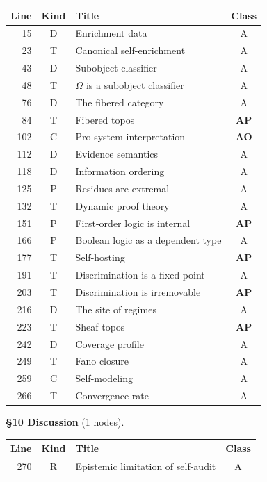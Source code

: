 \begin{center}
\scriptsize
\begin{tabular}{r|c|l|c}
\textbf{Line} & \textbf{Kind} & \textbf{Title} & \textbf{Class} \\
\hline
15 & \textsf{D} & Enrichment data & A \\
23 & \textsf{T} & Canonical self-enrichment & A \\
43 & \textsf{D} & Subobject classifier & A \\
48 & \textsf{T} & $\Omega$ is a subobject classifier & A \\
76 & \textsf{D} & The fibered category & A \\
84 & \textsf{T} & Fibered topos & \textbf{AP} \\
102 & \textsf{C} & Pro-system interpretation & \textbf{AO} \\
112 & \textsf{D} & Evidence semantics & A \\
118 & \textsf{D} & Information ordering & A \\
125 & \textsf{P} & Residues are extremal & A \\
132 & \textsf{T} & Dynamic proof theory & A \\
151 & \textsf{P} & First-order logic is internal & \textbf{AP} \\
166 & \textsf{P} & Boolean logic as a dependent type & A \\
177 & \textsf{T} & Self-hosting & \textbf{AP} \\
191 & \textsf{T} & Discrimination is a fixed point & A \\
203 & \textsf{T} & Discrimination is irremovable & \textbf{AP} \\
216 & \textsf{D} & The site of regimes & A \\
223 & \textsf{T} & Sheaf topos & \textbf{AP} \\
242 & \textsf{D} & Coverage profile & A \\
249 & \textsf{T} & Fano closure & A \\
259 & \textsf{C} & Self-modeling & A \\
266 & \textsf{T} & Convergence rate & A \\
\end{tabular}
\end{center}

\medskip
\noindent\textbf{\S10 Discussion} (1 nodes).

\begin{center}
\scriptsize
\begin{tabular}{r|c|l|c}
\textbf{Line} & \textbf{Kind} & \textbf{Title} & \textbf{Class} \\
\hline
270 & \textsf{R} & Epistemic limitation of self-audit & A \\
\end{tabular}
\end{center}

